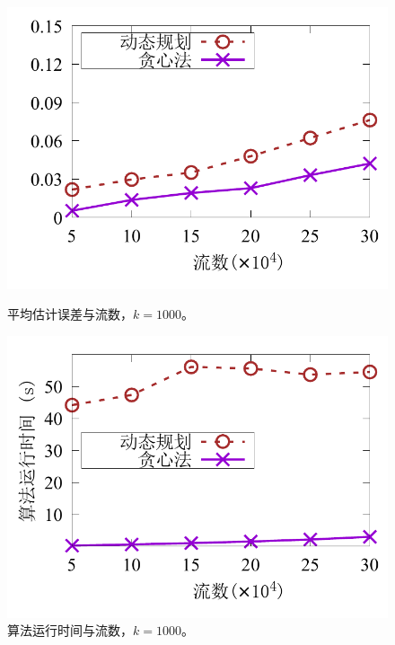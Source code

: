 \begin{figure}[ht]
	\centering
	\begin{minipage}[t]{0.48\linewidth}		
		\centering
		\includegraphics[width=\linewidth]{fig/msc_cmp_appr.pdf}
		\caption{\textnormal{平均估计误差与流数，$k=1000$。}}
		\label{fig:msc,appr}
	\end{minipage}\vspace{-0.6em}\hspace{0.4em}
	\begin{minipage}[t]{0.48\linewidth}
		\centering
		\includegraphics[width=\linewidth]{fig/msc_cmp_time.pdf}
		\caption{\textnormal{算法运行时间与流数，$k=1000$。}}
		\label{fig:msc,time}
	\end{minipage}\vspace{-0.6em}
\end{figure}

